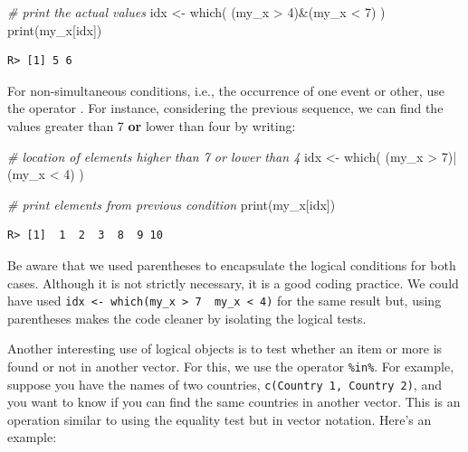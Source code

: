 \documentclass[
  12pt,
]{book}
\newenvironment{Shaded}{\begin{snugshade}}{\end{snugshade}}
\newcommand{\CommentTok}[1]{\textcolor[rgb]{0.37,0.37,0.37}{\textit{#1}}}
\newcommand{\DecValTok}[1]{\textcolor[rgb]{0.06,0.06,0.06}{#1}}
\newcommand{\FunctionTok}[1]{\textcolor[rgb]{0,0,0}{#1}}
\newcommand{\NormalTok}[1]{#1}
\newcommand{\OtherTok}[1]{\textcolor[rgb]{0.37,0.37,0.37}{#1}}
\newcommand{\SpecialCharTok}[1]{\textcolor[rgb]{0,0,0}{#1}}
\begin{document}
\begin{Shaded}
\begin{Highlighting}[]
\CommentTok{\# print the actual values}
\NormalTok{idx }\OtherTok{\textless{}{-}} \FunctionTok{which}\NormalTok{( (my\_x }\SpecialCharTok{\textgreater{}} \DecValTok{4}\NormalTok{)}\SpecialCharTok{\&}\NormalTok{(my\_x }\SpecialCharTok{\textless{}} \DecValTok{7}\NormalTok{) )}
\FunctionTok{print}\NormalTok{(my\_x[idx])}
\end{Highlighting}
\end{Shaded}

\begin{verbatim}
R> [1] 5 6
\end{verbatim}

For non-simultaneous conditions, i.e., the occurrence of one event or other, use the operator \texttt{\textbar{}}. For instance, considering the previous sequence, we can find the values greater than 7 \textbf{or} lower than four by writing: 

\begin{Shaded}
\begin{Highlighting}[]
\CommentTok{\# location of elements higher than 7 or lower than 4}
\NormalTok{idx }\OtherTok{\textless{}{-}} \FunctionTok{which}\NormalTok{( (my\_x }\SpecialCharTok{\textgreater{}} \DecValTok{7}\NormalTok{)}\SpecialCharTok{|}\NormalTok{(my\_x }\SpecialCharTok{\textless{}} \DecValTok{4}\NormalTok{) )}

\CommentTok{\# print elements from previous condition}
\FunctionTok{print}\NormalTok{(my\_x[idx])}
\end{Highlighting}
\end{Shaded}

\begin{verbatim}
R> [1]  1  2  3  8  9 10
\end{verbatim}

Be aware that we used parentheses to encapsulate the logical conditions for both cases. Although it is not strictly necessary, it is a good coding practice. We could have used \texttt{idx\ \textless{}-\ which(my\_x\ \textgreater{}\ 7\ \textbar{}\ my\_x\ \textless{}\ 4)} for the same result but, using parentheses makes the code cleaner by isolating the logical tests.

Another interesting use of logical objects is to test whether an item or more is found or not in another vector. For this, we use the operator \texttt{\%in\%}. For example, suppose you have the names of two countries, \texttt{c(\textquotesingle{}Country\ 1\textquotesingle{},\ \textquotesingle{}Country\ 2\textquotesingle{})}, and you want to know if you can find the same countries in another vector. This is an operation similar to using the equality test but in vector notation. Here's an example:
\end{document}
